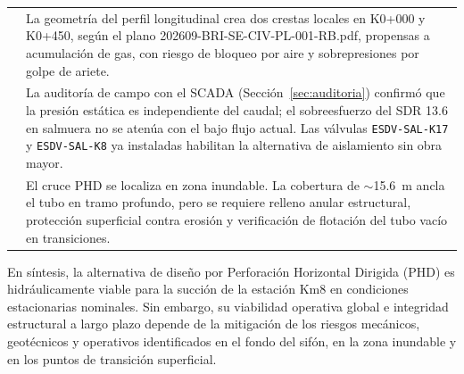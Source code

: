 \begin{table}[htbp]
\begin{tabularx}{\textwidth}{@{}NX@{}}
        & La geometría del perfil longitudinal crea dos crestas locales en K0+000 y K0+450, según el plano 202609-BRI-SE-CIV-PL-001-RB.pdf, propensas a acumulación de gas, con riesgo de bloqueo por aire y sobrepresiones por golpe de ariete. \\
        & La auditoría de campo con el SCADA (Sección~\ref{sec:auditoria}) confirmó que la presión estática es independiente del caudal; el sobreesfuerzo del SDR 13.6 en salmuera no se atenúa con el bajo flujo actual. Las válvulas \texttt{ESDV-SAL-K17} y \texttt{ESDV-SAL-K8} ya instaladas habilitan la alternativa de aislamiento sin obra mayor. \\
        & El cruce PHD se localiza en zona inundable. La cobertura de $\sim$\SI{15.6}{\meter} ancla el tubo en tramo profundo, pero se requiere relleno anular estructural, protección superficial contra erosión y verificación de flotación del tubo vacío en transiciones. \\
        \bottomrule
    \end{tabularx}
\end{table}

En síntesis, la alternativa de diseño por Perforación Horizontal Dirigida (PHD) es hidráulicamente viable para la succión de la estación Km8 en condiciones estacionarias nominales. Sin embargo, su viabilidad operativa global e integridad estructural a largo plazo depende de la mitigación de los riesgos mecánicos, geotécnicos y operativos identificados en el fondo del sifón, en la zona inundable y en los puntos de transición superficial.
